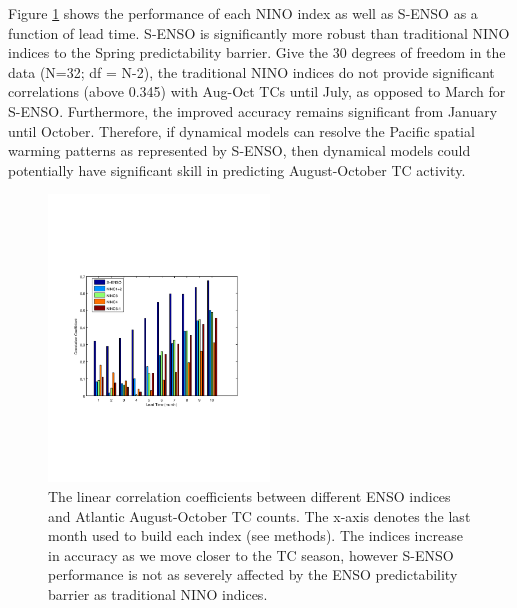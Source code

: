 Figure \ref{fig:figures_lead_time_bar} shows the performance of each NINO index as well as S-ENSO as a function of lead time.  S-ENSO is significantly more robust than traditional NINO indices to the Spring predictability barrier. Give the 30 degrees of freedom in the data (N=32; df = N-2), the traditional NINO indices do not provide significant correlations  (above 0.345) with Aug-Oct TCs until July, as opposed to March for S-ENSO. Furthermore, the improved accuracy remains significant from January until October. Therefore, if dynamical models can resolve the Pacific spatial warming patterns as represented by S-ENSO, then dynamical models could potentially have significant skill in predicting August-October TC activity.


\begin{figure}[htbp]
	\centering
		\includegraphics[height=3in]{figures/lead_time_bar.pdf}
	\caption{The linear correlation coefficients between different ENSO indices and Atlantic August-October TC counts. The x-axis denotes the last month used to build each index (see methods). The indices increase in accuracy as we move closer to the TC season, however S-ENSO performance is not as severely affected by the ENSO predictability barrier as traditional NINO indices.}
	\label{fig:figures_lead_time_bar}
\end{figure}

\newpage

